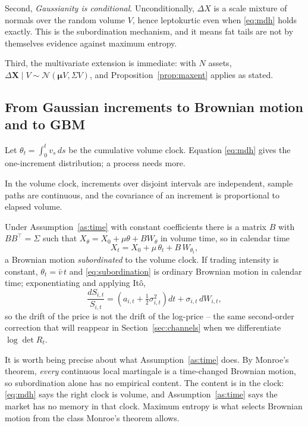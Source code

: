 Second, \emph{Gaussianity is conditional}. Unconditionally,
$\Delta X$ is a scale mixture of normals over the random volume $V$, hence
leptokurtic even when \eqref{eq:mdh} holds exactly. This is the
\citet{mandelbrot1967} subordination mechanism, and it means fat tails are not
by themselves evidence against maximum entropy.

Third, the multivariate extension is immediate: with $N$ assets,
$\Delta \mathbf{X}\mid V \sim \mathcal N(\boldsymbol\mu V, \Sigma V)$, and
Proposition~\ref{prop:maxent} applies as stated.

\subsection{From Gaussian increments to Brownian motion and to GBM}

Let $\theta_t=\int_0^t v_s\,ds$ be the cumulative volume clock. Equation
\eqref{eq:mdh} gives the one-increment distribution; a process needs more.

\begin{assumption}\label{as:time}
In the volume clock, increments over disjoint intervals are independent, sample
paths are continuous, and the covariance of an increment is proportional to
elapsed volume.
\end{assumption}

Under Assumption~\ref{as:time} with constant coefficients there is a matrix $B$
with $BB^{\!\top}=\Sigma$ such that $X_\theta = X_0 + \mu\theta + BW_\theta$ in
volume time, so in calendar time
\begin{equation}
\label{eq:subordination}
X_t = X_0 + \mu\,\theta_t + B\,W_{\theta_t},
\end{equation}
a Brownian motion \emph{subordinated} to the volume clock. If trading intensity
is constant, $\theta_t=\bar v\,t$ and \eqref{eq:subordination} is ordinary
Brownian motion in calendar time; exponentiating and applying Itô,
\begin{equation}
\frac{dS_{i,t}}{S_{i,t}} = \left(a_{i,t}+\tfrac12\sigma_{i,t}^2\right)dt + \sigma_{i,t}\,dW_{i,t},
\end{equation}
so the drift of the price is not the drift of the log-price -- the same
second-order correction that will reappear in Section~\ref{sec:channels} when we
differentiate $\log\det R_t$.

It is worth being precise about what Assumption~\ref{as:time} does. By Monroe's
\citeyearpar{monroe1978} theorem, \emph{every} continuous local martingale is a
time-changed Brownian motion, so subordination alone has no empirical content.
The content is in the clock: \eqref{eq:mdh} says the right clock is volume, and
Assumption~\ref{as:time} says the market has no memory in that clock. Maximum
entropy is what selects Brownian motion from the class Monroe's theorem allows.

